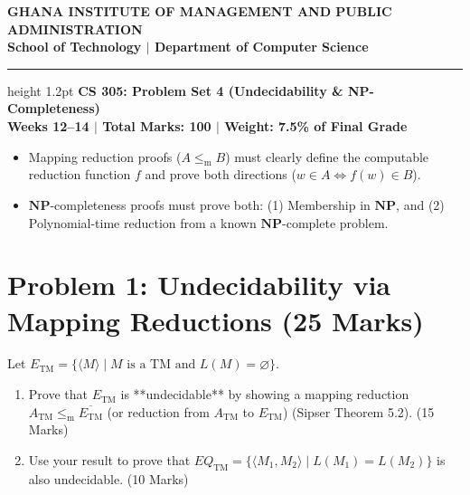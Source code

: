 \documentclass[11pt,a4paper]{article}
\begin{document}
\begin{center}
    {\Large \textbf{\color{gimpanavy}GHANA INSTITUTE OF MANAGEMENT AND PUBLIC ADMINISTRATION}}\\
    {\large \textbf{\color{gimpaaccent}School of Technology $|$ Department of Computer Science}}\\
    \vspace{4pt}
    \hrule height 1.2pt \color{gimpanavy}
    \vspace{6pt}
    {\LARGE \textbf{\color{gimpanavy}CS 305: Problem Set 4 (Undecidability \& NP-Completeness)}}\\
    {\large \textbf{Weeks 12--14 $|$ Total Marks: 100 $|$ Weight: 7.5\% of Final Grade}}
\end{center}

\vspace{6pt}

\begin{tcolorbox}[colback=gimpalight, colframe=gimpanavy, title=\textbf{Instructions \& Guidelines}]
\begin{itemize}[leftmargin=1.2em, itemsep=2pt]
    \item Mapping reduction proofs ($A \le_{\text{m}} B$) must clearly define the computable reduction function $f$ and prove both directions ($w \in A \iff f(w) \in B$).
    \item $\mathbf{NP}$-completeness proofs must prove both: (1) Membership in $\mathbf{NP}$, and (2) Polynomial-time reduction from a known $\mathbf{NP}$-complete problem.
\end{itemize}
\end{tcolorbox}

\vspace{8pt}

\section*{Problem 1: Undecidability via Mapping Reductions (25 Marks)}
Let $E_{\text{TM}} = \{\langle M \rangle \mid M \text{ is a TM and } L(M) = \varnothing\}$.
\begin{enumerate}[label=\textbf{(\alph*)}]
    \item Prove that $E_{\text{TM}}$ is **undecidable** by showing a mapping reduction $A_{\text{TM}} \le_{\text{m}} \overline{E_{\text{TM}}}$ (or reduction from $A_{\text{TM}}$ to $E_{\text{TM}}$) (Sipser Theorem 5.2). (15 Marks)
    \item Use your result to prove that $EQ_{\text{TM}} = \{\langle M_1, M_2 \rangle \mid L(M_1) = L(M_2)\}$ is also undecidable. (10 Marks)
\end{enumerate}
\end{document}
